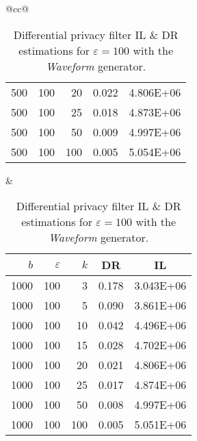 \begin{table}[H]
\begin{tabular}{@{}cc@{}}
\begin{tabular}{@{}rrrrr@{}}
			500	&	100	&	20	&	0.022	&	4.806E+06 \\
			500	&	100	&	25	&	0.018	&	4.873E+06 \\
			500	&	100	&	50	&	0.009	&	4.997E+06 \\
			500	&	100	&	100	&	0.005	&	5.054E+06 \\
		\end{tabular}
		&
		\begin{tabular}{@{}rrrrr@{}}
			\toprule
			$b$ & $\varepsilon$ & $k$ & \multicolumn{1}{c}{DR} & \multicolumn{1}{c}{IL} \\ \midrule
			1000	&	100	&	3	&	0.178	&	3.043E+06 \\
			1000	&	100	&	5	&	0.090	&	3.861E+06 \\
			1000	&	100	&	10	&	0.042	&	4.496E+06 \\
			1000	&	100	&	15	&	0.028	&	4.702E+06 \\
			1000	&	100	&	20	&	0.021	&	4.806E+06 \\
			1000	&	100	&	25	&	0.017	&	4.874E+06 \\
			1000	&	100	&	50	&	0.008	&	4.997E+06 \\
			1000	&	100	&	100	&	0.005	&	5.051E+06 \\
		\end{tabular}
	\end{tabular}
	\caption[Differential privacy filter DR \& IL estimations (Waveform), $\varepsilon = 100$.]{Differential privacy filter IL \& DR estimations for $\varepsilon = 100$ with the \textit{Waveform} generator.}
\end{table}
